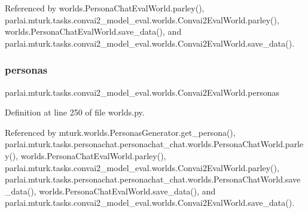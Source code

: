 Referenced by worlds.\+Persona\+Chat\+Eval\+World.\+parley(), parlai.\+mturk.\+tasks.\+convai2\+\_\+model\+\_\+eval.\+worlds.\+Convai2\+Eval\+World.\+parley(), worlds.\+Persona\+Chat\+Eval\+World.\+save\+\_\+data(), and parlai.\+mturk.\+tasks.\+convai2\+\_\+model\+\_\+eval.\+worlds.\+Convai2\+Eval\+World.\+save\+\_\+data().

\mbox{\label{classparlai_1_1mturk_1_1tasks_1_1convai2__model__eval_1_1worlds_1_1Convai2EvalWorld_aae94215ebc470d0ac5ee523bd65b04e3}} 
\subsubsection{\texorpdfstring{personas}{personas}}
{\footnotesize\ttfamily parlai.\+mturk.\+tasks.\+convai2\+\_\+model\+\_\+eval.\+worlds.\+Convai2\+Eval\+World.\+personas}



Definition at line 250 of file worlds.\+py.



Referenced by mturk.\+worlds.\+Personas\+Generator.\+get\+\_\+persona(), parlai.\+mturk.\+tasks.\+personachat.\+personachat\+\_\+chat.\+worlds.\+Persona\+Chat\+World.\+parley(), worlds.\+Persona\+Chat\+Eval\+World.\+parley(), parlai.\+mturk.\+tasks.\+convai2\+\_\+model\+\_\+eval.\+worlds.\+Convai2\+Eval\+World.\+parley(), parlai.\+mturk.\+tasks.\+personachat.\+personachat\+\_\+chat.\+worlds.\+Persona\+Chat\+World.\+save\+\_\+data(), worlds.\+Persona\+Chat\+Eval\+World.\+save\+\_\+data(), and parlai.\+mturk.\+tasks.\+convai2\+\_\+model\+\_\+eval.\+worlds.\+Convai2\+Eval\+World.\+save\+\_\+data().

\mbox{\label{classparlai_1_1mturk_1_1tasks_1_1convai2__model__eval_1_1worlds_1_1Convai2EvalWorld_aa02c614eed2a38a396d6983a8cdab7a3}} 
